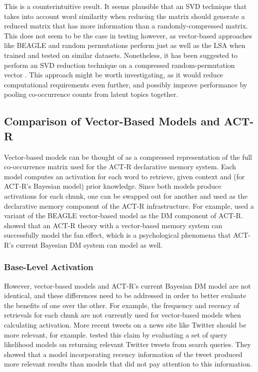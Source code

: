 \documentclass[man,floatsintext,donotrepeattitle]{apa6}
\begin{document}
This is a counterintuitive result.
It seems plausible that an SVD technique that takes into account word similarity when reducing the matrix should generate a reduced matrix that has more information than a randomly-compressed matrix.
This does not seem to be the case in testing however, as vector-based approaches like BEAGLE and random permutations perform just as well as the LSA when trained and tested on similar datasets.
Nonetheless, it has been suggested to perform an SVD reduction technique on a compressed random-permutation vector \parencite{Kanerva2000}.
This approach might be worth investigating, as it would reduce computational requirements even further, and possibly improve performance by pooling co-occurrence counts from latent topics together.

\subsection{Comparison of Vector-Based Models and ACT-R}

Vector-based models can be thought of as a compressed representation of the full co-occurrence matrix used for the ACT-R declarative memory system.
Each model computes an activation for each word to retrieve, given context and (for ACT-R's Bayesian model) prior knowledge.
Since both models produce activations for each chunk, one can be swapped out for another and used as the declarative memory component of the ACT-R infrastructure.
For example, \textcite{Rutledge2007} used a variant of the BEAGLE vector-based model as the DM component of ACT-R.
\textcite{Rutledge2008} showed that an ACT-R theory with a vector-based memory system can successfully model the fan effect, which is a psychological phenomena that ACT-R's current Bayesian DM system can model as well.

\subsubsection{Base-Level Activation}

However, vector-based models and ACT-R's current Bayesian DM model are not identical, and these differences need to be addressed in order to better evaluate the benefits of one over the other.
For example, the frequency and recency of retrievals for each chunk are not currently used for vector-based models when calculating activation.
More recent tweets on a news site like Twitter should be more relevant, for example.
\textcite{Efron2011} tested this claim by evaluating a set of query likelihood models on returning relevant Twitter tweets from search queries.
They showed that a model incorporating recency information of the tweet produced more relevant results than models that did not pay attention to this information.
\end{document}
